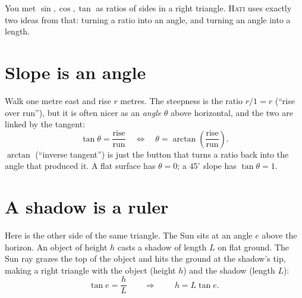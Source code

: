\documentclass[11pt,oneside]{book}
\begin{document}
You met $\sin,\cos,\tan$ as ratios of sides in a right triangle. \textsc{Hati} uses
exactly two ideas from that: turning a ratio into an angle, and turning an angle into
a length.

\section{Slope is an angle}
Walk one metre east and rise $r$ metres. The steepness is the ratio $r/1=r$ (``rise
over run''), but it is often nicer as an \emph{angle} $\theta$ above horizontal, and
the two are linked by the tangent:
\begin{equation}
\tan\theta=\frac{\text{rise}}{\text{run}}\quad\Longleftrightarrow\quad
\theta=\arctan\!\left(\frac{\text{rise}}{\text{run}}\right).
\end{equation}
$\arctan$ (``inverse tangent'') is just the button that turns a ratio back into the
angle that produced it. A flat surface has $\theta=0$; a $45^\circ$ slope has
$\tan\theta=1$.

\section{A shadow is a ruler}
Here is the other side of the same triangle. The Sun sits at an angle $e$ above the
horizon. An object of height $h$ casts a shadow of length $L$ on flat ground. The Sun
ray grazes the top of the object and hits the ground at the shadow's tip, making a
right triangle with the object (height $h$) and the shadow (length $L$):
\begin{equation}
\tan e=\frac{h}{L}\qquad\Longrightarrow\qquad \boxed{\,h=L\tan e.\,}
\label{eq:shadow}
\end{equation}

\begin{center}
\end{center}
\end{document}
